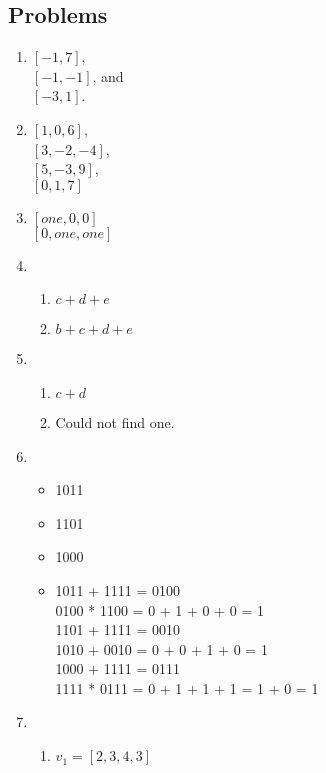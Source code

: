 \documentclass{article}
\begin{document}
    \subsection{Problems}
    \begin{enumerate}
        \item $[-1, 7]$, \\
            $[-1, -1]$, and \\
            $[-3, 1]$.
        \item $[1,0,6]$, \\
            $[3,-2,-4]$, \\
            $[5,-3,9]$, \\
            $[0,1,7]$
        \item $[one,0,0]$ \\
            $[0,one,one]$
        \item 
            \begin{enumerate}
                \item $c + d + e$
                \item $b + c + d + e$
            \end{enumerate}
        \item 
            \begin{enumerate}
                \item $c + d$
                \item Could not find one.
            \end{enumerate}
        \item 
            \begin{itemize}
                \item 1011
                \item 1101
                \item 1000
                \item 1011 + 1111 = 0100 \\
                    0100 * 1100 = 0 + 1 + 0 + 0 = 1 \\
                    1101 + 1111 = 0010 \\
                    1010 + 0010 = 0 + 0 + 1 + 0 = 1 \\
                    1000 + 1111 = 0111 \\
                    1111 * 0111 = 0 + 1 + 1 + 1 = 1 + 0 = 1
            \end{itemize}
        \item 
            \begin{enumerate} 
                \item $v_1 = [2,3,4,3]$

\end{enumerate}
\end{enumerate}
\end{document}
